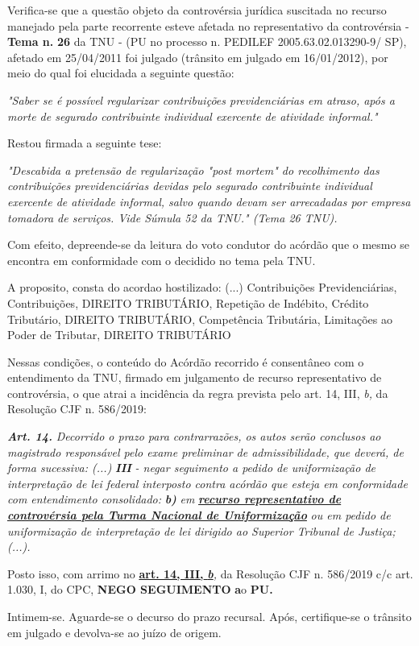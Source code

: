 \documentclass[12pt]{article}
\begin{document}
\justifying
\noindent Verifica-se que a questão objeto da controvérsia jurídica suscitada no recurso manejado pela parte recorrente esteve afetada no representativo da controvérsia - \textbf{Tema n. }\textbf{26} da TNU - (PU no processo n. PEDILEF 2005.63.02.013290-9/ SP),  afetado em 25/04/2011 foi julgado (trânsito em julgado em 16/01/2012), por meio do qual foi elucidada a seguinte questão:

\noindent \textit{"Saber se é possível regularizar contribuições previdenciárias em atraso, após a morte de segurado contribuinte individual exercente de atividade informal."}

\noindent Restou firmada a seguinte tese:

\noindent \textit{"Descabida a pretensão de regularização "post mortem" do recolhimento das contribuições previdenciárias devidas pelo segurado contribuinte individual exercente de atividade informal, salvo quando devam ser arrecadadas por empresa tomadora de serviços. Vide Súmula 52 da TNU." (Tema 26 TNU).}

\noindent Com efeito, depreende-se da leitura do voto condutor do acórdão que o mesmo se encontra em conformidade com o decidido no  tema pela TNU.

\noindent A proposito, consta do acordao hostilizado: (...) Contribuições Previdenciárias, Contribuições, DIREITO TRIBUTÁRIO, Repetição de Indébito, Crédito Tributário, DIREITO TRIBUTÁRIO, Competência Tributária, Limitações ao Poder de Tributar, DIREITO TRIBUTÁRIO

\noindent Nessas condições, o conteúdo do Acórdão recorrido é consentâneo com o entendimento da TNU, firmado em julgamento de recurso representativo de controvérsia, o que atrai a incidência da regra prevista pelo art. 14, III, \textit{b,} da Resolução CJF n. 586/2019:

\noindent \textit{\textbf{Art. 14.}}\textit{ Decorrido o prazo para contrarrazões, os autos serão conclusos ao magistrado responsável pelo exame preliminar de admissibilidade, que deverá, de forma sucessiva: (...) }\textit{\textbf{III }}\textit{- negar seguimento a pedido de uniformização de interpretação de lei federal interposto contra acórdão que esteja em conformidade com entendimento consolidado: }\textit{\textbf{b)}}\textit{ em }\uline{\textit{\textbf{recurso representativo de controvérsia pela Turma Nacional de Uniformização}}}\textit{ ou em pedido de uniformização de interpretação de lei dirigido ao Superior Tribunal de Justiça;(...).}

\noindent Posto isso, com arrimo no \uline{\textbf{art. 14, III, }}\uline{\textit{\textbf{b}}}\textit{,} da Resolução CJF n. 586/2019 c/c art. 1.030, I, do CPC, \textbf{NEGO SEGUIMENTO }\textbf{a}o\textbf{ PU}\textbf{.}

\noindent Intimem-se. Aguarde-se o decurso do prazo recursal. Após, certifique-se o trânsito em julgado e devolva-se ao juízo de origem.
\end{document}
